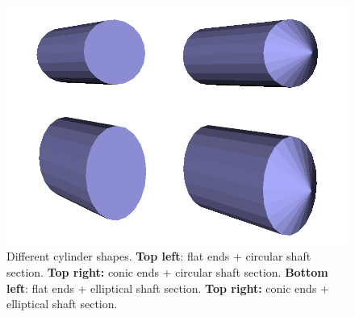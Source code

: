 \begin{figure}
  \centering
  \includegraphics[scale=0.5]{images/09/create_3D_printing_support_surfaces/conic_non_conic.png} 
	\caption{Different cylinder shapes. \textbf{Top left}: flat ends + circular shaft section. \textbf{Top right:} conic ends + circular shaft section. \textbf{Bottom left}: flat ends + elliptical shaft section. \textbf{Top right:} conic ends + elliptical shaft section.}
 \label{conic_non_conic}
\end{figure}

